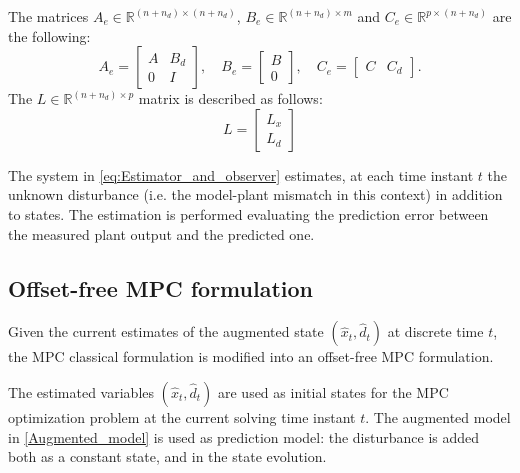 \documentclass[a4paper,12pt,oneside]{book}
\begin{document}
The matrices $A_e \in \mathbb{R}^{(n+n_d) \times (n+n_d)}$, $B_e \in \mathbb{R}^{(n+n_d) \times m}$ and $C_e \in \mathbb{R}^{p \times (n + n_d)}$ are the following:
\begin{equation}
    A_e =
    \begin{bmatrix}
        A & B_d \\
        0 & I  
    \end{bmatrix},
    \quad
    B_e = 
    \begin{bmatrix}
        B \\
        0  
    \end{bmatrix},
    \quad
    C_e = 
    \begin{bmatrix}
        C & C_d 
    \end{bmatrix}.
\end{equation}
The $L \in \mathbb{R}^{(n+n_d) \times p}$ matrix is described as follows:
\begin{equation}
    L =
    \begin{bmatrix}
        L_x \\
	L_d 
    \end{bmatrix}
\end{equation}

The system in \eqref{eq:Estimator_and_observer} estimates, at each time instant $t$ the unknown disturbance (i.e. the model-plant mismatch in this context) in addition to states. 
The estimation is performed evaluating the prediction error between the measured plant output and the predicted one.

\subsection*{Offset-free MPC formulation}
Given the current estimates of the augmented state $(\hat{x}_t, \hat{d}_t)$ at discrete time $t$, the MPC classical formulation is modified into an offset-free MPC formulation.

The estimated variables  $(\hat{x}_t, \hat{d}_t)$ are used as initial states for the MPC optimization problem at the current solving time instant $t$.
The augmented model in \eqref{Augmented_model} is used as prediction model: the disturbance is added both as a constant state, and in the state evolution.
\end{document}
